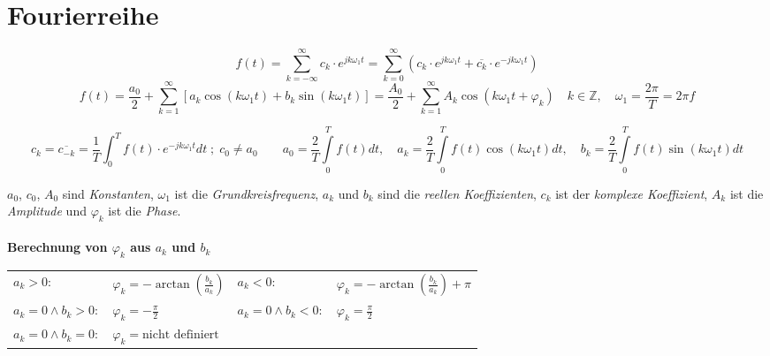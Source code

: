 \section{Fourierreihe}
  	$$\boxed{f(t) = \sum\limits_{k = -\infty}^{\infty} c_k \cdot e^{j k \omega_1
  	t}}= \boxed{\sum\limits_{k = 0}^{\infty} \left(c_k \cdot e^{j k \omega_1
  	t} + \overline{c_k} \cdot e^{-j k \omega_1t}\right)}$$
  	$$\boxed{f(t) = \frac{a_0}{2} + \sum\limits_{k=1}^{\infty} \left[a_k \cos(k
  	\omega_1 t) + b_k \sin(k \omega_1 t)\right]}=\boxed{\frac{A_0}{2} +
  	\sum\limits_{k=1}^{\infty} A_k \cos(k \omega_1 t + \varphi_k)} \quad k\in
  	\mathbb{Z}, \quad \omega_1=\frac{2 \pi}{T}=2 \pi f$$	
	
	$$\boxed{c_k=\overline{c_{-k}}=\frac{1}{T}\int_0^T{f(t)\cdot
	e^{-jk\omega_1
	t}dt} \; ; \; c_0 \neq a_0} \qquad \boxed{a_0 = \frac{2}{T}\int\limits_0^{T}
	f(t)dt, \quad a_k = \frac{2}{T}\int\limits_0^{T} f(t)\cos(k \omega_1 t) dt, \quad b_k =
	\frac{2}{T}\int\limits_0^{T} f(t)\sin(k \omega_1 t) dt}$$

	$a_0$, $c_0$, $A_0$ sind \textit{Konstanten}, $\omega_1$ ist die
	\textit{Grundkreisfrequenz}, $a_k$ und $b_k$ sind die \textit{reellen
	Koeffizienten}, $c_k$ ist der \textit{komplexe Koeffizient}, $A_k$ ist die
	\textit{Amplitude} und $\varphi_k$ ist die \textit{Phase}.\\
	\\

	\textbf{Berechnung von $\varphi_k$ aus $a_k$ und $b_k$}\\
	\begin{tabular}{p{4cm}p{4cm}p{3cm}p{3.5cm}}
		$a_k> 0:$ & $\varphi_k = -\arctan(\frac{b_k}{a_k})$ &
		$a_k<0:$ &	$\varphi_k = -\arctan(\frac{b_k}{a_k}) + \pi$\\
		$a_k = 0 \wedge b_k > 0:$ &	$\varphi_k = -\frac{\pi}{2}$ &
		$a_k = 0 \wedge b_k < 0:$ &	$\varphi_k = \frac{\pi}{2}$\\
		$a_k = 0 \wedge b_k = 0:$ &	$\varphi_k = \text{nicht definiert}$
	\end{tabular}

